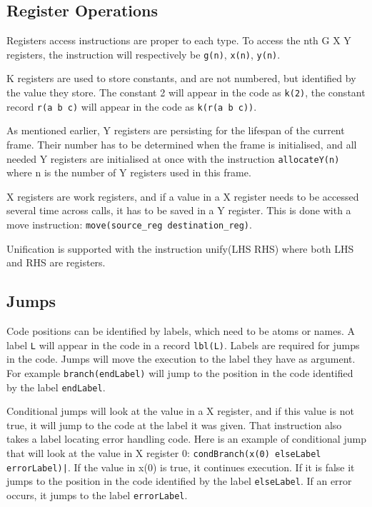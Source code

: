 \documentclass[a4paper]{memoir}
\begin{document}
\subsection{Register Operations}\label{sec:intro:opcode:registers}
Registers access instructions are proper to each type. To access the nth G X Y
registers, the instruction will respectively be \lstinline!g(n)!,
\lstinline!x(n)!, \lstinline!y(n)!. 

K registers are used to store constants, and are not numbered, but identified by
the value they store. The constant 2 will appear in the code as
\lstinline!k(2)!, the constant record \lstinline!r(a b c)! will appear in the
code as \lstinline!k(r(a b c))!.

As mentioned earlier, Y registers are persisting for the lifespan of the current frame. Their number has to be determined when the frame is initialised, and all needed Y registers are initialised at once with the instruction \lstinline!allocateY(n)! where n is the number of Y registers used in this frame.

X registers are work registers, and if a value in a X register needs to be accessed several time across calls, it has to be saved in a Y register. This is done with a move instruction: \lstinline!move(source_reg destination_reg)!.

Unification is supported with the instruction unify(LHS RHS) where both LHS and RHS are registers.

\subsection{Jumps}\label{sec:opcode:jumps}
Code positions can be identified by labels, which need to be atoms or names. A label \lstinline!L! will appear in the code in a record \lstinline!lbl(L)!. 
Labels are required for jumps in the code. 
Jumps will move the execution to the label they have as argument. For example \lstinline!branch(endLabel)! will jump to the position in the code identified by the label \lstinline!endLabel!.

Conditional jumps will look at the value in a X register, and if this value is not true, it will jump to the code at the label it was given. That instruction also takes a label locating error handling code. Here is an example of conditional jump that will look at the value in X register 0: \lstinline!condBranch(x(0) elseLabel errorLabel)|!. If the value in x(0) is true, it continues execution. If it is false it jumps to the position in the code identified by the label \lstinline!elseLabel!. If an error occurs, it jumps to the label \lstinline!errorLabel!.
\end{document}
